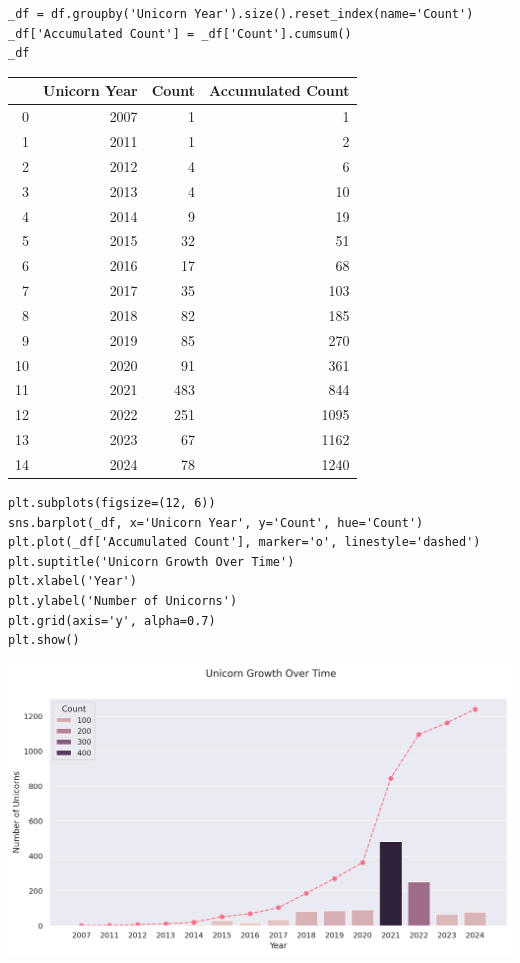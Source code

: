 \documentclass[a4paper,12pt]{article}
\begin{document}
\begin{verbatim}
_df = df.groupby('Unicorn Year').size().reset_index(name='Count')
_df['Accumulated Count'] = _df['Count'].cumsum()
_df
\end{verbatim}

\begin{table}[htbp]
\label{}
\centering
\begin{tabular}{rrrr}
 & Unicorn Year & Count & Accumulated Count\\
\hline
0 & 2007 & 1 & 1\\
1 & 2011 & 1 & 2\\
2 & 2012 & 4 & 6\\
3 & 2013 & 4 & 10\\
4 & 2014 & 9 & 19\\
5 & 2015 & 32 & 51\\
6 & 2016 & 17 & 68\\
7 & 2017 & 35 & 103\\
8 & 2018 & 82 & 185\\
9 & 2019 & 85 & 270\\
10 & 2020 & 91 & 361\\
11 & 2021 & 483 & 844\\
12 & 2022 & 251 & 1095\\
13 & 2023 & 67 & 1162\\
14 & 2024 & 78 & 1240\\
\end{tabular}
\end{table}

\begin{verbatim}
plt.subplots(figsize=(12, 6))
sns.barplot(_df, x='Unicorn Year', y='Count', hue='Count')
plt.plot(_df['Accumulated Count'], marker='o', linestyle='dashed')
plt.suptitle('Unicorn Growth Over Time')
plt.xlabel('Year')
plt.ylabel('Number of Unicorns')
plt.grid(axis='y', alpha=0.7)
plt.show()
\end{verbatim}

\begin{center}
\includegraphics[width=.9\linewidth]{./.ob-jupyter/d0d12df1781da2dd3b73538a92eaf3d9976e74ee.png}
\label{}
\end{center}
\end{document}
